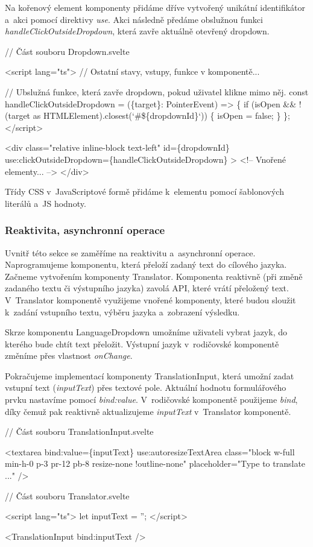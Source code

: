 Na kořenový element komponenty přidáme dříve vytvořený unikátní identifikátor a~akci pomocí direktivy \emph{use}. 
Akci následně předáme obslužnou funkci \emph{handleClickOutsideDropdown}, která zavře aktuálně otevřený dropdown.

\begin{prog}
// Část souboru Dropdown.svelte

<script lang="ts">
  // Ostatní stavy, vstupy, funkce v komponentě...

  // Ubslužná funkce, která zavře dropdown, pokud uživatel klikne mimo něj.
  const handleClickOutsideDropdown = (\{target\}: PointerEvent) => \{
    if (isOpen && !(target as HTMLElement).closest(`#\$\{dropdownId\}`)) \{
      isOpen = false;
    \}
  \};
</script>
  
<div
  class="relative inline-block text-left"
  id=\{dropdownId\}
  use:clickOutsideDropdown=\{handleClickOutsideDropdown\}
>
  <!-- Vnořené elementy... -->
</div>
\end{prog}

Třídy CSS v~JavaScriptové formě přidáme k~elementu pomocí šablonových literálů a~JS hodnoty.

\subsubsection*{Reaktivita, asynchronní operace}

Uvnitř této sekce se zaměříme na reaktivitu a~asynchronní operace. Naprogramujeme komponentu, která přeloží zadaný text do cílového jazyka. 
Začneme vytvořením komponenty Translator. Komponenta reaktivně (při změně zadaného textu či výstupního jazyka) zavolá API, které vrátí přeložený text. 
V~Translator komponentě využijeme vnořené komponenty, které budou sloužit k~zadání vstupního textu, výběru jazyka a~zobrazení výsledku.

Skrze komponentu LanguageDropdown umožníme uživateli vybrat jazyk, do kterého bude chtít text přeložit. Výstupní jazyk v~rodičovské komponentě změníme přes vlastnost \emph{onChange}.

Pokračujeme implementací komponenty TranslationInput, která umožní zadat vstupní text (\emph{inputText}) přes textové pole. Aktuální hodnotu formulářového prvku nastavíme pomocí \emph{bind:value}. 
V~rodičovské komponentě použijeme \emph{bind}, díky čemuž pak reaktivně aktualizujeme \emph{inputText} v~Translator komponentě.

\begin{prog}
// Část souboru TranslationInput.svelte

<textarea
  bind:value=\{inputText\}
  use:autoresizeTextArea
  class="block w-full min-h-0 p-3 pr-12 pb-8 resize-none !outline-none"
  placeholder="Type to translate ..."
/>

// Část souboru Translator.svelte

<script lang="ts">
  let inputText = '';
</script>

<TranslationInput bind:inputText />
\end{prog}

